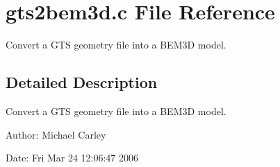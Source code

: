 \section{gts2bem3d.c File Reference}
\label{gts2bem3d_8c}
Convert a GTS geometry file into a BEM3D model. 



\subsection{Detailed Description}
Convert a GTS geometry file into a BEM3D model. 

\begin{Desc}
\item[Author:]Michael Carley \end{Desc}
\begin{Desc}
\item[Date:]Fri Mar 24 12:06:47 2006 \end{Desc}

